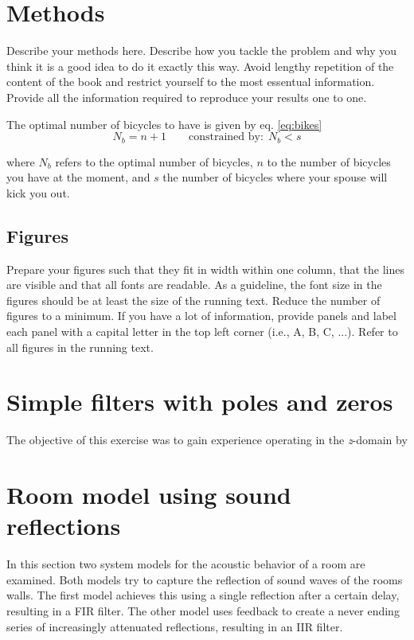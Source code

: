 \documentclass[journal]{IEEEtran}
\begin{document}
\section{Methods}
Describe your methods here. Describe how you tackle the problem and why you think it is a good idea to do it exactly this way. Avoid lengthy repetition of the content of the book and restrict yourself to the most essentual information. Provide all the information required to reproduce your results one to one.

The optimal number of bicycles to have is given by eq. \ref{eq:bikes}
\begin{equation}\label{eq:bikes}
 N_b = n + 1 \qquad \mbox{constrained by:} \ \ N_b < s
\end{equation}

where $N_b$ refers to the optimal number of bicycles, $n$ to the number of bicycles you have at the moment, and $s$ the number of bicycles where your spouse will kick you out.


\subsection{Figures}
Prepare your figures such that they fit in width within one column, that the lines are visible and that all fonts are readable. As a guideline, the font size in the figures should be at least the size of the running text. Reduce the number of figures to a minimum. If you have a lot of information, provide panels and label each panel with a capital letter in the top left corner (i.e., A, B, C, ...). Refer to all figures in the running text. 
\clearpage
\newpage
\section{Simple filters with poles and zeros}
The objective of this exercise was to gain experience operating in the \textit{z}-domain by 

\clearpage
\newpage

\section{Room model using sound reflections}

In this section two system models for the acoustic behavior of a room are examined. Both models try to capture the reflection of sound waves of the rooms walls. The first model achieves this using a single reflection after a certain delay, resulting in a FIR filter. The other model uses feedback to create a never ending series of increasingly attenuated reflections, resulting in an IIR filter.
\end{document}
